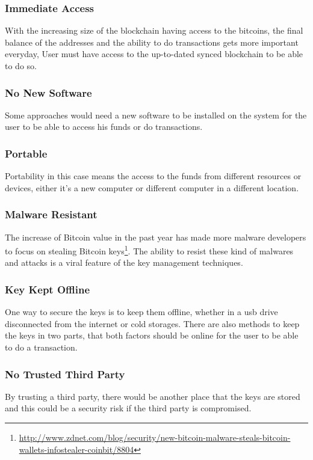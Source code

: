 \subsubsection{Immediate Access}
\label{Immediate Access}

With the increasing size of the blockchain having access to the bitcoins, the final balance of the addresses and the ability to do transactions gets more important everyday, User must have access to the up-to-dated synced blockchain to be able to do so.

\subsubsection{No New Software} 
\label{No New Software}

Some approaches would need a new software to be installed on the system for the user to be able to access his funds or do transactions.

\subsubsection{Portable}
\label{Portable}

Portability in this case means the access to the funds from different resources or devices, either it's a new computer or different computer in a different location.

\subsubsection{Malware Resistant}
\label{Malware Resistant}
The increase of Bitcoin value in the past year has made more malware developers to focus on stealing Bitcoin keys\footnote{\url{http://www.zdnet.com/blog/security/new-bitcoin-malware-steals-bitcoin-wallets-infostealer-coinbit/8804}}. The ability to resist these kind of malwares and attacks is a viral feature of the key management techniques.

\subsubsection{Key Kept Offline} 
\label{Key Kept Offline}
One way to secure the keys is to keep them offline, whether in a usb drive disconnected from the internet or cold storages. There are also methods to keep the keys in two parts, that both factors should be online for the user to be able to do a transaction.

\subsubsection{No Trusted Third Party}
\label{No Trusted Third Party}
By trusting a third party, there would be another place that the keys are stored and this could be a security risk if the third party is compromised.

